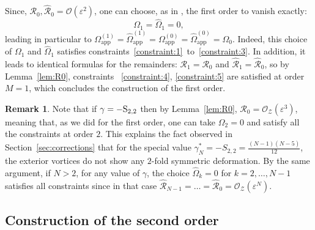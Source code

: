 \documentclass[11pt,reqno,a4paper]{amsart}
\def\eps{\varepsilon}
\newcommand{\cO}{\mathcal{O}}
\newcommand{\cR}{\mathcal{R}}
\newcommand{\cZ}{\mathcal{Z}}
\newcommand{\1}{\mathbbm{1}}
\theoremstyle{definition}
\newtheorem{remark}[proposition]{Remark}
\theoremstyle{definition}
\numberwithin{equation}{section}
\newcommand{\Mapp}[2]{#1^{(#2)}_\mathrm{app}}
\begin{document}
Since, $\cR_0, \widehat{\cR}_0 = \cO(\eps^2)$, one can choose, as in \cite{Gallay2011,dolce2024long,donati2025fast,zhang2025long}, the first order to vanish exactly:
\begin{equation}
    \Omega_1 = \widehat{\Omega}_1 = 0,
\end{equation}
leading in particular to $\Mapp{\Omega}{1} = \Mapp{\widehat{\Omega}}{1} = \Mapp{\Omega}{0} = \Mapp{\widehat{\Omega}}{0} = \Omega_0$. Indeed, this choice of $\Omega_1$ and $\widehat{\Omega}_1$ satisfies constraints~\ref{constraint:1}~to~\ref{constraint:3}. In addition, it leads to identical formulas for the remainders: $\cR_1 = \cR_0$ and $\widehat{\cR}_1 = \widehat{\cR}_0$, so by Lemma~\ref{lem:R0}, constraints~ \ref{constraint:4}, \ref{constraint:5} are satisfied at order $M=1$, which concludes the construction of the first order.

\begin{remark}
\label{rem:special}
    Note that if $\gamma=-{\rm S}_{2,2}$ then by Lemma~\ref{lem:R0}, $\cR_0 = \cO_{\cZ}(\eps^3)$, meaning that, as we did for the first order, one can take $\Omega_2=0$ and satisfy all the constraints at order $2$. This explains the fact observed in Section~\ref{sec:corrections} that for the special value $\gamma_N^* = -S_{2,2} = \frac{(N-1)(N-5)}{12}$, the exterior vortices do not show any $2$-fold symmetric deformation. By the same argument, if $N>2$, for any value of $\gamma$, the choice $\widehat{\Omega}_k=0$ for $k=2,\dots,N-1$ satisfies all constraints since in that case $\widehat{\cR}_{N-1} = \ldots = \widehat{\cR}_0 = \cO_{\cZ}(\eps^N)$.
\end{remark}



\subsection{Construction of the second order}\label{sec:second_order}
\end{document}
